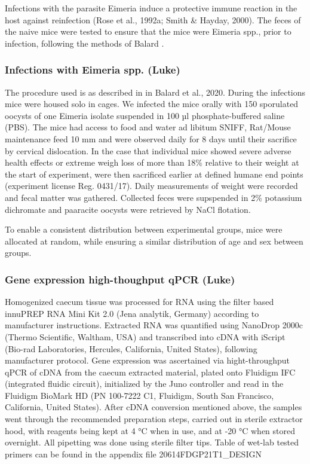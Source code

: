 \documentclass[webpdf,large,contemporary,namedate]{oup-authoring-template}
\theoremstyle{thmstyleone}
\theoremstyle{thmstyletwo}
\theoremstyle{thmstylethree}
\begin{document}
Infections with the parasite Eimeria induce a protective immune reaction
in the host against reinfection (Rose et al., 1992a; Smith \& Hayday,
2000). The feces of the naive mice were tested to ensure that the mice
were Eimeria spp., prior to infection, following the methods of Balard
\citet{balard2020coupling}.

\hypertarget{infections-with-eimeria-spp.-luke}{%
\subsubsection{Infections with Eimeria spp.
(Luke)}\label{infections-with-eimeria-spp.-luke}}

The procedure used is as described in in Balard et al., 2020. During the
infections mice were housed solo in cages. We infected the mice orally
with 150 sporulated oocysts of one Eimeria isolate suspended in 100 µl
phosphate-buffered saline (PBS). The mice had access to food and water
ad libitum SNIFF, Rat/Mouse maintenance feed 10 mm and were observed
daily for 8 days until their sacrifice by cervical dislocation. In the
case that individual mice showed severe adverse health effects or
extreme weigh loss of more than 18\% relative to their weight at the
start of experiment, were then sacrificed earlier at defined humane end
points (experiment license Reg. 0431/17). Daily measurements of weight
were recorded and fecal matter was gathered. Collected feces were
supspended in 2\% potassium dichromate and paaracite oocysts were
retrieved by NaCl flotation.

To enable a consistent distribution between experimental groups, mice
were allocated at random, while ensuring a similar distribution of age
and sex between groups.

\hypertarget{gene-expression-high-thoughput-qpcr-luke}{%
\subsubsection{Gene expression high-thoughput qPCR
(Luke)}\label{gene-expression-high-thoughput-qpcr-luke}}

Homogenized caecum tissue was processed for RNA using the filter based
innuPREP RNA Mini Kit 2.0 (Jena analytik, Germany) according to
manufacturer instructions. Extracted RNA was quantified using NanoDrop
2000c (Thermo Scientific, Waltham, USA) and transcribed into cDNA with
iScript (Bio-rad Laboratories, Hercules, California, United States),
following manufacturer protocol. Gene expression was ascertained via
hight-throughput qPCR of cDNA from the caecum extracted material, plated
onto Fluidigm IFC (integrated fluidic circuit), initialized by the Juno
controller and read in the Fluidigm BioMark HD (PN 100-7222 C1,
Fluidigm, South San Francisco, California, United States). After cDNA
conversion mentioned above, the samples went through the recommended
preparation steps, carried out in sterile extractor hood, with reagents
being kept at 4 °C when in use, and at -20 °C when stored overnight. All
pipetting was done using sterile filter tips. Table of wet-lab tested
primers can be found in the appendix file 20614FDGP21T1\_DESIGN
\end{document}
